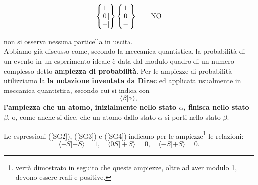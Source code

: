 \documentclass[a4paper,12pt,oneside]{book}
\begin{document}
	\begin{equation}
		\begin{Bmatrix}
 			\makebox[\widthof{$-$}]{$+$}\makebox[\widthof{$|$}]{$\ $} \\ \makebox[\widthof{$-$}]{$0$}|\\ - |  
		\end{Bmatrix}
		\begin{Bmatrix}
 			\makebox[\widthof{$-$}]{$+$} |  \\ \makebox[\widthof{$-$}]{$0$}|  \\ -\makebox[\widthof{$|$}]{$\ $}  
		\end{Bmatrix} \qquad \text{NO}
	\label{SG4}
	\end{equation}

non si osserva nessuna particella in uscita.\\

Abbiamo già discusso come, secondo la meccanica quantistica, la probabilità di un evento in un esperimento ideale è data dal modulo quadro di un numero complesso detto \textbf{ampiezza di probabilità}. Per le ampiezze di probabilità utilizziamo la \textbf{la notazione inventata da Dirac} ed applicata usualmente in meccanica quantistica, secondo cui si indica con 
	\begin{equation}
		\boxed{\boxed{
			\langle\beta |\alpha \rangle ,
			}}
	\end{equation} 
\textbf{l'ampiezza che un atomo, inizialmente nello stato $\alpha$, finisca nello stato $\beta$}, o, come anche si dice, che un atomo dallo stato $\alpha$ si porti nello stato $\beta$.

Le espressioni (\ref{SG2}), (\ref{SG3}) e (\ref{SG4}) indicano per le ampiezze\footnote{verrà dimostrato in seguito che queste ampiezze, oltre ad aver modulo 1, devono essere reali e positive.} le relazioni:
	\begin{equation}
		\boxed{
			\langle +S |+S \rangle =1, \quad \langle 0S | +S \rangle =0, \quad \langle -S | +S \rangle=0 .
			}
	\label{cap3_1}
	\end{equation} 
\end{document}
